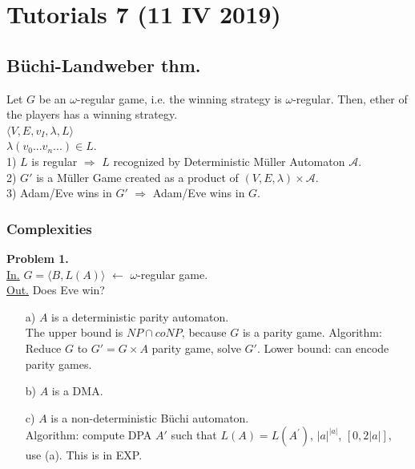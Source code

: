 \section{Tutorials 7 (11 IV 2019)}
\subsection*{Büchi-Landweber thm.}
Let $G$ be an $\omega$-regular game, i.e. the winning strategy is $\omega$-regular.
Then, ether of the players has a winning strategy.\\

\noindent
$\langle V, E, v_I, \lambda, L \rangle$\\
$\lambda(v_0...v_n...) \in L$.\\
1) $L$ is regular $\Rightarrow$ $L$ recognized by Deterministic Müller Automaton $\mathcal{A}$.\\
2) $G'$ is a Müller Game created as a product of $(V, E, \lambda) \times \mathcal{A}$.\\
3) Adam/Eve wins in $G'$ $\Rightarrow$ Adam/Eve wins in $G$.

\subsubsection*{Complexities}
\textbf{Problem 1.}\\
\underline{In.} $G = \langle B, L(A) \rangle$ $\leftarrow$ $\omega$-regular game.\\
\underline{Out.} Does Eve win?\\
\begin{itemize}
    \item[a)] $A$ is a deterministic parity automaton.\\
    The upper bound is $NP \cap coNP$, because $G$ is a parity game.
    Algorithm: Reduce $G$ to $G' = G \times A$ parity game, solve $G'$.
    Lower bound: can encode parity games.
    \item[b)] $A$ is a DMA.
    \item[c)] $A$ is a non-deterministic Büchi automaton.\\
    Algorithm: compute DPA $A'$ such that $L(A) = L(A^\prime)$, $|a|^{|a|}$, $[0, 2|a|]$, use (a). This is in EXP.
\end{itemize}


